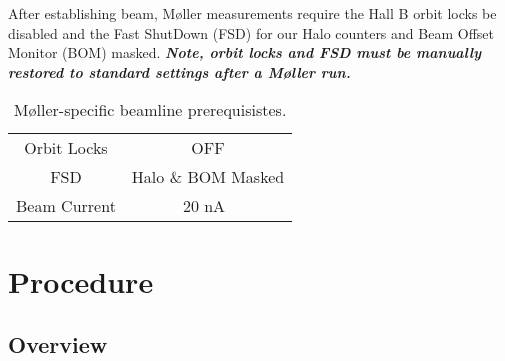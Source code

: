 \documentclass[amsmath,amssymb,notitlepage,12pt]{revtex4}
\newcommand{\ibeam}{20 nA\ }
\begin{document}
After establishing beam, M{\o}ller measurements require the Hall B orbit locks be disabled and the Fast ShutDown (FSD) for our Halo counters and Beam Offset Monitor (BOM) masked.  {\bf\em Note, orbit locks and FSD must be manually restored to standard settings after a M{\o}ller run.}

\begin{table}[htbp]\centering
    \begin{tabular}{c|c}\toprule[1.5pt]
        Orbit Locks & OFF\\
        FSD & Halo \& BOM Masked\\
        Beam Current & \ibeam \\
        \bottomrule[1.5pt]
    \end{tabular}
    \caption{M{\o}ller-specific beamline prerequisistes.}
\end{table}

\newpage

\section{Procedure}

\subsection{Overview}
\end{document}
